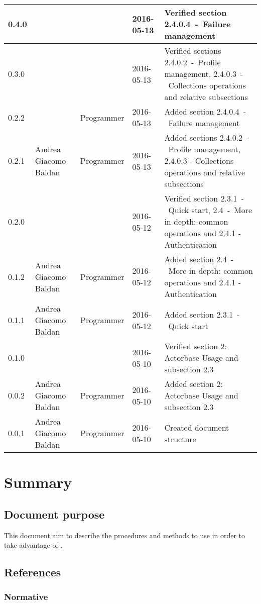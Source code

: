 \documentclass{scalatekids-article}
\begin{document}
\begin{center}
\begin{longtable}{| l | l | l | l | p{5cm} |}
    \hline
    0.4.0 & & & 2016-05-13 & Verified section 2.4.0.4\ -\ Failure management\\
    \hline
    0.3.0 & & & 2016-05-13 & Verified sections 2.4.0.2\ -\ Profile management, 2.4.0.3\ -\ Collections operations and relative subsections\\
    \hline
    0.2.2 & & Programmer & 2016-05-13 & Added section 2.4.0.4\ -\ Failure management\\
    \hline
    0.2.1 & Andrea Giacomo Baldan & Programmer & 2016-05-13 & Added sections 2.4.0.2\ -\ Profile management, 2.4.0.3 - Collections operations and relative subsections\\
    \hline
    0.2.0 &  &  & 2016-05-12 & Verified section 2.3.1\ -\ Quick start, 2.4\ -\ More in depth: common operations and 2.4.1 - Authentication\\
    \hline
    0.1.2 & Andrea Giacomo Baldan & Programmer & 2016-05-12 & Added section 2.4\ -\ More in depth: common operations and 2.4.1 - Authentication\\
    \hline
    0.1.1 & Andrea Giacomo Baldan & Programmer & 2016-05-12 & Added section 2.3.1\ -\ Quick start\\
    \hline
    0.1.0 &  &  & 2016-05-10 & Verified section 2: Actorbase Usage and subsection 2.3\\
    \hline
    0.0.2 & Andrea Giacomo Baldan & Programmer & 2016-05-10 & Added section 2: Actorbase Usage and subsection 2.3\\
    \hline
    0.0.1 & Andrea Giacomo Baldan & Programmer & 2016-05-10 & Created document structure\\
    \hline
  \end{longtable}
\end{center}
\tableofcontents
\newpage
{}
\section{Summary}
\subsection{Document purpose}
This document aim to describe the procedures and methods to use in order to take advantage of .

\subsection{References}

\subsubsection{Normative} %
\end{document}

